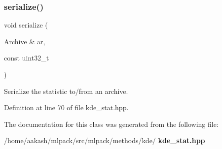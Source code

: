 \subsubsection{serialize()}
{\footnotesize\ttfamily void serialize (\begin{DoxyParamCaption}\item[{Archive \&}]{ar,  }\item[{const uint32\+\_\+t}]{ }\end{DoxyParamCaption})\hspace{0.3cm}{\ttfamily [inline]}}



Serialize the statistic to/from an archive. 



Definition at line 70 of file kde\+\_\+stat.\+hpp.



The documentation for this class was generated from the following file\+:\begin{DoxyCompactItemize}
\item 
/home/aakash/mlpack/src/mlpack/methods/kde/\textbf{ kde\+\_\+stat.\+hpp}\end{DoxyCompactItemize}
